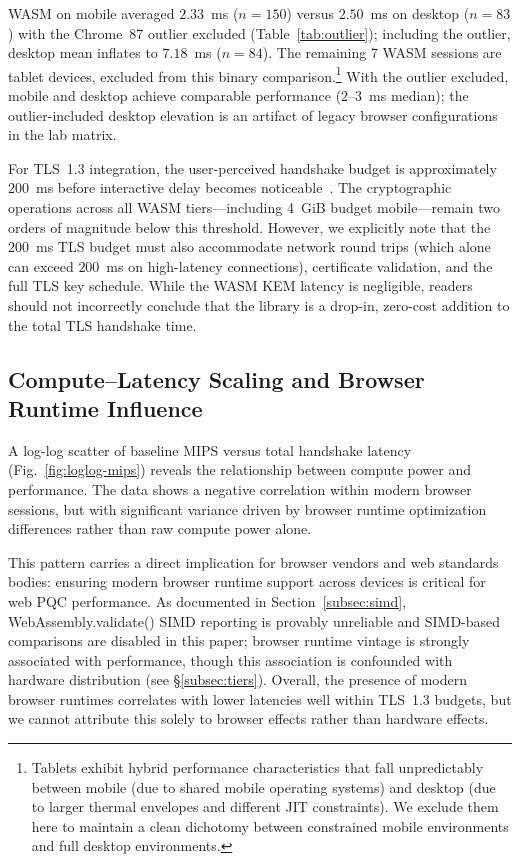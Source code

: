 \documentclass[11pt,a4paper]{article}
\def\texttt#1{#1}%
\begin{document}
WASM on mobile averaged $2.33$~ms ($n=150$) versus $2.50$~ms on desktop ($n=83$) with the Chrome~87 outlier excluded (Table~\ref{tab:outlier}); including the outlier, desktop mean inflates to $7.18$~ms ($n=84$). The remaining 7 WASM sessions are tablet devices, excluded from this binary comparison.\footnote{Tablets exhibit hybrid performance characteristics that fall unpredictably between mobile (due to shared mobile operating systems) and desktop (due to larger thermal envelopes and different JIT constraints). We exclude them here to maintain a clean dichotomy between constrained mobile environments and full desktop environments.} With the outlier excluded, mobile and desktop achieve comparable performance ($2$--$3$~ms median); the outlier-included desktop elevation is an artifact of legacy browser configurations in the lab matrix.

For TLS~1.3 integration, the user-perceived handshake budget is approximately $200$~ms before interactive delay becomes noticeable~\cite{nielsen1993usability}. The cryptographic operations across all WASM tiers---including 4~GiB budget mobile---remain two orders of magnitude below this threshold. However, we explicitly note that the $200$~ms TLS budget must also accommodate network round trips (which alone can exceed $200$~ms on high-latency connections), certificate validation, and the full TLS key schedule. While the WASM KEM latency is negligible, readers should not incorrectly conclude that the library is a drop-in, zero-cost addition to the total TLS handshake time.

\subsection{Compute--Latency Scaling and Browser Runtime Influence}
\label{subsec:scaling}

A log-log scatter of baseline MIPS versus total handshake latency (Fig.~\ref{fig:loglog-mips}) reveals the relationship between compute power and performance. The data shows a negative correlation within modern browser sessions, but with significant variance driven by browser runtime optimization differences rather than raw compute power alone.

This pattern carries a direct implication for browser vendors and web standards bodies: ensuring modern browser runtime support across devices is critical for web PQC performance. As documented in Section~\ref{subsec:simd}, \texttt{WebAssembly.validate()} SIMD reporting is provably unreliable and SIMD-based comparisons are disabled in this paper; browser runtime vintage is strongly associated with performance, though this association is confounded with hardware distribution (see \S\ref{subsec:tiers}). Overall, the presence of modern browser runtimes correlates with lower latencies well within TLS~1.3 budgets, but we cannot attribute this solely to browser effects rather than hardware effects.
\end{document}
